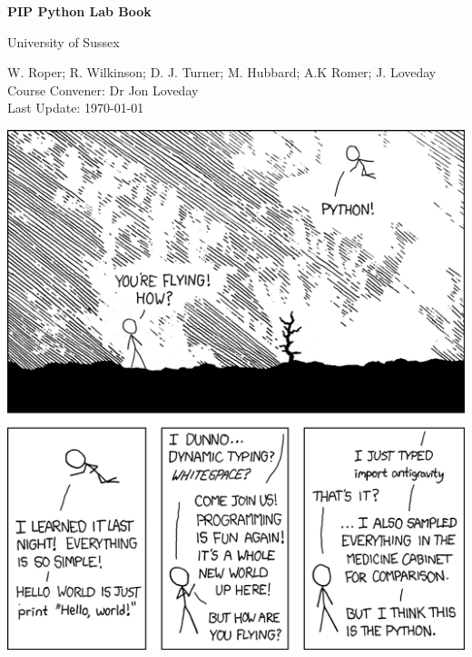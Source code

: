 \begin{titlepage}
\begin{center}

        
  {\Huge\textbf{PIP Python Lab Book}}
  \vspace{0.5cm} %

{\Large University of Sussex}
\vspace{1cm} %
      

{\large W. Roper; R. Wilkinson; D. J. Turner; M. Hubbard; A.K Romer; J. Loveday\\

Course Convener: Dr Jon Loveday\\
        
Last Update: \today\\
        
}

\vspace{2cm} %

\includegraphics[width=0.8\linewidth]{Pictures/pythonxkcd.png}\\

\end{center}
\end{titlepage}

